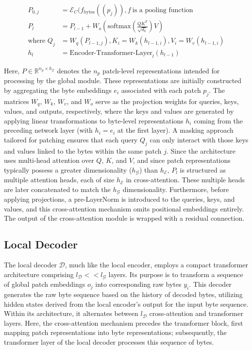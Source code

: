 \begin{align}
P_{0,j} &= \mathcal{E}_{C}(f_\text{bytes}((p_j)), f~ \text{is a pooling function} \\
P_l &= P_{l-1} + W_o\left(\text{softmax}\left(\frac{QK^T}{\sqrt{d_k}}\right)V\right) \\
\text{where } Q_j &= W_q(P_{l-1,j}), K_i = W_k(h_{l-1,i}), V_i = W_v(h_{l-1,i}) \\
h_l &= \text{Encoder-Transformer-Layer}_l(h_{l-1})
\end{align}

Here, $P \in \mathbb{R}^{n_p \times h_{\mathcal{G}}}$ denotes the $n_p$ patch-level representations intended for processing by the global module. These representations are initially constructed by aggregating the byte embeddings $e_i$ associated with each patch $p_j$. The matrices $W_q$, $W_k$, $W_v$, and $W_o$ serve as the projection weights for queries, keys, values, and outputs, respectively, where the keys and values are generated by applying linear transformations to byte-level representations $h_i$ coming from the preceding network layer (with $h_i = e_i$ at the first layer). A masking approach tailored for patching ensures that each query $Q_j$ can only interact with those keys and values linked to the bytes within the same patch $j$. Since the architecture uses multi-head attention over $Q$, $K$, and $V$, and since patch representations typically possess a greater dimensionality ($h_{\mathcal{G}}$) than $h_{\mathcal{E}}$, $P_l$ is structured as multiple attention heads, each of size $h_{\mathcal{E}}$ in cross-attention. These multiple heads are later concatenated to match the $h_{\mathcal{G}}$ dimensionality. Furthermore, before applying projections, a pre-LayerNorm is introduced to the queries, keys, and values, and this cross-attention mechanism omits positional embeddings entirely. The output of the cross-attention module is wrapped with a residual connection.

\subsection{Local Decoder} 

The local decoder $\mathcal{D}$, much like the local encoder, employs a compact transformer architecture comprising $l_{\mathcal{D}} << l_{\mathcal{G}}$ layers. Its purpose is to transform a sequence of global patch embeddings $o_j$ into corresponding raw bytes $y_i$. This decoder generates the raw byte sequence based on the history of decoded bytes, utilizing hidden states derived from the local encoder’s output for the input byte sequence. Within its architecture, it alternates between $l_{\mathcal{D}}$ cross-attention and transformer layers. Here, the cross-attention mechanism precedes the transformer block, first mapping patch representations into byte representations; subsequently, the transformer layer of the local decoder processes this sequence of bytes.

